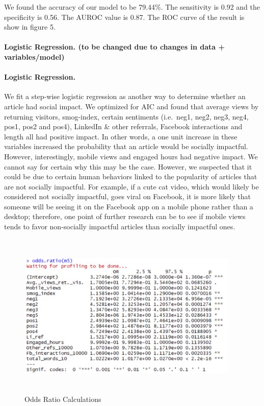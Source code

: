 \documentclass[10pt,letterpaper]{article}
\begin{document}
We found the accuracy of our model to be 79.44\%. The sensitivity is
0.92 and the specificity is 0.56. The AUROC value is 0.87. The ROC curve
of the result is show in figure 5.

\paragraph{Logistic Regression. (to be changed due to changes in data +
variables/model)}\label{logistic-regression.-to-be-changed-due-to-changes-in-data-variablesmodel}
\hypertarget{logistic-regression.}{%
\paragraph{Logistic Regression.}\label{logistic-regression.}}

We fit a step-wise logistic regression as another way to determine
whether an article had social impact. We optimized for AIC and found
that average views by returning visitors, smog-index, certain sentiments
(i.e.~neg1, neg2, neg3, neg4, pos1, pos2 and pos4), LinkedIn \& other
referrals, Facebook interactions and length all had positive impact. In
other words, a one unit increase in these variables increased the
probability that an article would be socially impactful. However,
interestingly, mobile views and engaged hours had negative impact. We
cannot say for certain why this may be the case. However, we suspected
that it could be due to certain human behaviors linked to the popularity
of articles that are not socially impactful. For example, if a cute cat
video, which would likely be considered not socially impactful, goes
viral on Facebook, it is more likely that someone will be seeing it on
the Facebook app on a mobile phone rather than a desktop; therefore, one
point of further research can be to see if mobile views tends to favor
non-socially impactful articles than socially impactful ones.

\begin{figure}
\includegraphics[width=400px,height=300px]{odds-ratio} \caption{Odds Ratio Calculations}\label{fig:unnamed-chunk-6}
\end{figure}
\end{document}

